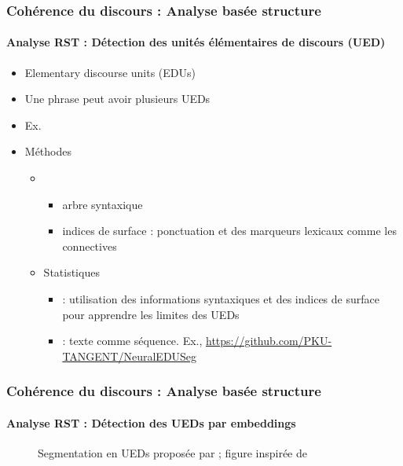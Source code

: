 \documentclass[xcolor=table]{beamer}
\begin{document}
\begin{frame}
	\frametitle{Cohérence du discours : Analyse basée structure}
	\framesubtitle{Analyse RST : Détection des unités élémentaires de discours (UED)}
	
	\begin{itemize}
		\item Elementary discourse units (EDUs)
		\item Une phrase peut avoir plusieurs UEDs 
		\item Ex. 
		\item Méthodes 
		\begin{itemize}
			\item {}
			\begin{itemize}
				\item arbre syntaxique
				\item indices de surface : ponctuation et des marqueurs lexicaux comme les connectives
			\end{itemize}
			\item Statistiques 
			\begin{itemize}
				\item {} : utilisation des informations syntaxiques et des indices de surface pour apprendre les limites des UEDs
				\item {} : texte comme séquence. Ex., \url{https://github.com/PKU-TANGENT/NeuralEDUSeg}
			\end{itemize}
		\end{itemize}
	\end{itemize}
	
\end{frame}

\begin{frame}
	\frametitle{Cohérence du discours : Analyse basée structure}
	\framesubtitle{Analyse RST : Détection des UEDs par embeddings}
	
	\begin{figure}
		\centering
		\caption{Segmentation en UEDs proposée par \cite{2018-wang-al} ; figure inspirée de \cite{2019-jurafsky-martin}}
	\end{figure}
	
\end{frame}
\end{document}
